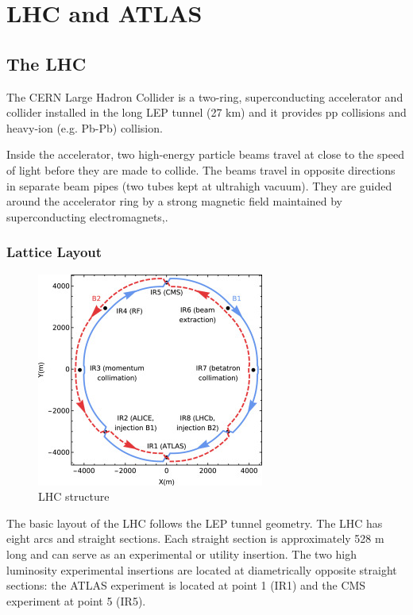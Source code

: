 \documentclass[a4paper, oneside]{book}
\begin{document}
\tableofcontents

	\chapter{LHC and ATLAS}
		\section{The LHC}
			The CERN Large Hadron Collider is a two-ring, superconducting accelerator and collider installed in the long LEP tunnel (27 km)\cite{LHC design} and it provides pp collisions and heavy-ion (e.g. Pb-Pb) collision.
			
			Inside the accelerator, two high-energy particle beams travel at close to the speed of light before they are made to collide. The beams travel in opposite directions in separate beam pipes (two tubes kept at ultrahigh vacuum). They are guided around the accelerator ring by a strong magnetic field maintained by superconducting electromagnets\cite{LHC introduction},\cite{LHC site}.
				\subsection{Lattice Layout}
					\begin{figure}[H]
						\centering
						\includegraphics[width=0.3\textheight]{tesi_images/LHC_structure.jpg}
						\caption{LHC structure}
						\label{fig:LHC structure}
					\end{figure}
					The basic layout of the LHC follows the LEP tunnel geometry. The LHC has eight arcs and straight sections. Each straight section is approximately 528 m long and can serve as an experimental or utility insertion. The two high luminosity experimental insertions are located at diametrically opposite straight sections: the ATLAS experiment is located at point 1 (IR1) and the CMS experiment at point 5 (IR5).
					
\end{document}
